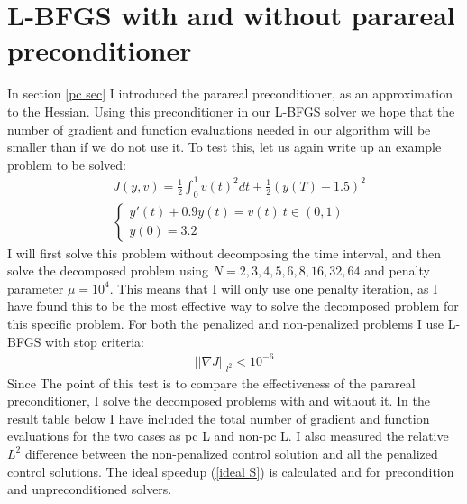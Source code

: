 \section{L-BFGS with and without parareal preconditioner}
In section \ref{pc sec} I introduced the parareal preconditioner, as an approximation to the Hessian. Using this preconditioner in our L-BFGS solver we hope that the number of gradient and function evaluations needed in our algorithm will be smaller than if we do not use it. To test this, let us again write up an example problem to be solved:
\begin{align*}
&J(y,v) = \frac{1}{2}\int_0^1v(t)^2dt + \frac{1}{2}(y(T)-1.5)^2 \\
&\left\{
     \begin{array}{lr}
       	y'(t)+0.9y(t) = v(t) \ t\in(0,1)\\
       	y(0)=3.2
     \end{array}
   \right. 
\end{align*}
I will first solve this problem without decomposing the time interval, and then solve the decomposed problem using $N=2,3,4,5,6,8,16,32,64$ and penalty parameter $\mu=10^4$. This means that I will only use one penalty iteration, as I have found this to be the most effective way to solve the decomposed problem for this specific problem. For both the penalized and non-penalized problems I use L-BFGS with stop criteria:
\begin{align*}
||\nabla J||_{l^2} <10^{-6}
\end{align*}  
Since The point of this test is to compare the effectiveness of the parareal preconditioner, I solve the decomposed problems with and without it. In the result table below I have included the total number of gradient and function evaluations for the two cases as pc L and non-pc L. I also measured the relative $L^2$ difference between the non-penalized control solution and all the penalized control solutions. The ideal speedup (\ref{ideal S}) is calculated and for precondition and unpreconditioned solvers.
